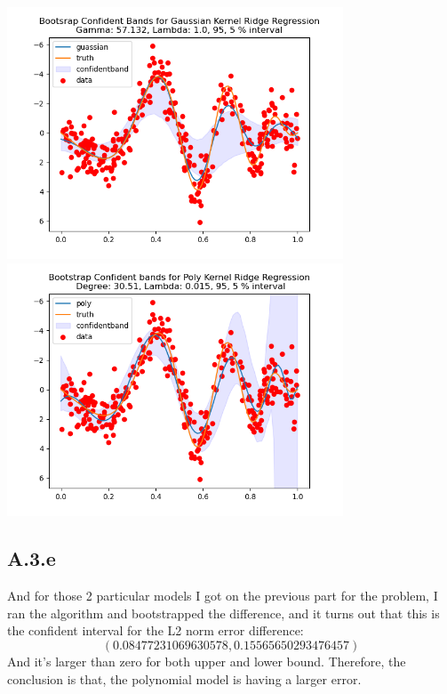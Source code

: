 \documentclass[]{article}
\begin{document}
        \begin{center}
            \includegraphics[width=10cm]{hypertune300/gaussian-boopstraped.png}
            \includegraphics[width=10cm]{hypertune300/Poly-boopstraped.png}
        \end{center}
    \subsection*{A.3.e}
        And for those 2 particular models I got on the previous part for the problem, I ran the algorithm and bootstrapped the difference, and it turns out that this is the confident interval for the L2 norm error difference: 
        $$(0.08477231069630578, 0.15565650293476457)$$
        And it's larger than zero for both upper and lower bound. Therefore, the conclusion is that, the polynomial model is having a larger error. 
\end{document}

